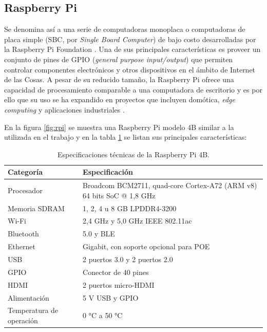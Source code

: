 \subsection{Raspberry Pi}
\label{sec:Raspberry Pi}
Se denomina así a una serie de computadoras monoplaca o computadoras de placa simple (SBC, por \textit{Single Board Computer}) de bajo costo desarrolladas por la Raspberry Pi Foundation \citep{raspberrypi:1}.
Una de sus principales características es proveer un conjunto de pines de GPIO (\textit{general purpose input/output}) que permiten controlar componentes electrónicos y otros dispositivos en el ámbito de Internet de las Cosas.
A pesar de su reducido tamaño, la Raspberry Pi ofrece una capacidad de procesamiento comparable a una computadora de escritorio y es por ello que su uso se ha expandido en proyectos que incluyen domótica, \textit{edge computing} y aplicaciones industriales \citep{raspberrypi:2}. 

En la figura \ref{fig:rpi} se muestra una Raspberry Pi modelo 4B similar a la utilizada en el trabajo y en la tabla \ref{tab:raspberrypi} se listan sus principales características: 
 
\begin{table}[h]
\centering
\caption[Especificaciones técnicas de la Raspberry Pi 4B]{Especificaciones técnicas de la Raspberry Pi 4B.}

\begin{tabular}{p{2.5cm} p{7.5cm} } 
\toprule
\textbf{Categoría} & \textbf{Especificación}\citep{rpi4b }\\

\midrule
Procesador	& Broadcom BCM2711, quad-core Cortex-A72 (ARM v8) 64 bits SoC @ 1,8 GHz \\
Memoria SDRAM	 & 1, 2, 4 u 8 GB LPDDR4-3200 \\
Wi-Fi	& 2,4 GHz y 5,0 GHz IEEE 802.11ac \\
Bluetooth	&  5.0 y BLE \\
Ethernet	& Gigabit, con soporte opcional para POE\\
USB	& 2 puertos  3.0 y 2 puertos 2.0\\
GPIO	&	Conector de 40 pines\\
HDMI	&  2 puertos micro-HDMI\\
Alimentación	& 5 V USB y GPIO\\
Temperatura de operación	& 0 °C a 50 °C \\
\bottomrule
\hline
\end{tabular}
\label{tab:raspberrypi}
\end{table}
 
